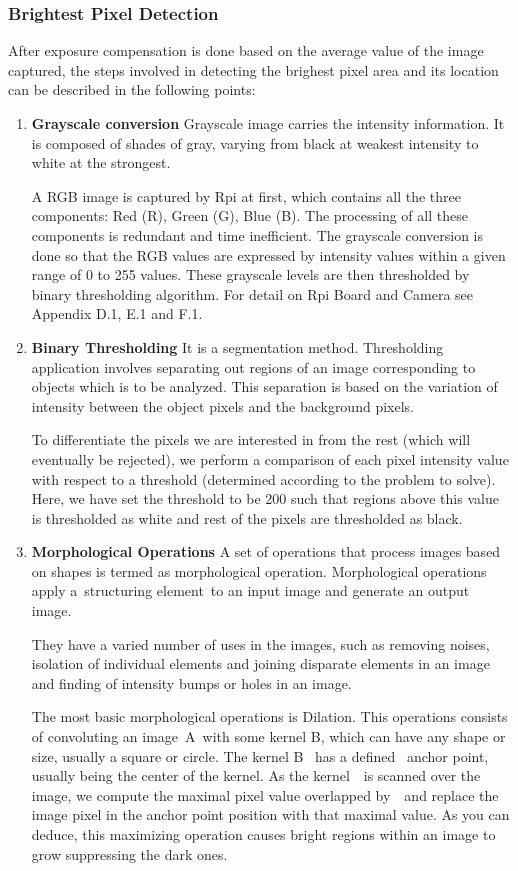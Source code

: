 \documentclass[12pt, a4paper]{article}
\begin{document}
\subsubsection{Brightest Pixel Detection}
After exposure compensation is done based on the average value of the image captured, the steps involved in detecting the brighest pixel area and its location can be described in the following points:
\begin{enumerate}
\item {\textbf{Grayscale conversion}} Grayscale image carries the intensity information. It is composed of shades of gray, varying from black at weakest intensity to white at the strongest. 

A RGB image is captured by Rpi at first, which contains all the three components: Red (R), Green (G), Blue (B). The processing of all these components is redundant and time inefficient. The grayscale conversion is done so that the RGB values are expressed by intensity values within a given range of 0 to 255 values. These grayscale levels are then thresholded by binary thresholding algorithm. For detail on Rpi Board and Camera see Appendix D.1, E.1 and F.1.
\newpage
\item {\textbf{Binary Thresholding}} It is a segmentation method. Thresholding application involves separating out regions of an image corresponding to objects which is to be analyzed. This separation is based on the variation of intensity between the object pixels and the background pixels.

To differentiate the pixels we are interested in from the rest (which will eventually be rejected), we perform a comparison of each pixel intensity value with respect to a threshold (determined according to the problem to solve). Here, we have set the threshold to be 200 such that regions above this value is thresholded as white and rest of the pixels are thresholded as black.

\item {\textbf{Morphological Operations}}
A set of operations that process images based on shapes is termed as morphological operation. Morphological operations apply a structuring element to an input image and generate an output image.

They have a varied number of uses in the images, such as removing noises, isolation of individual elements and joining disparate elements in an image and finding of intensity bumps or holes in an image. 

The most basic morphological operations is Dilation. This operations consists of convoluting an image A with some kernel B, which can have any shape or size, usually a square or circle. The kernel B  has a defined  anchor point, usually being the center of the kernel. As the kernel  is scanned over the image, we compute the maximal pixel value overlapped by  and replace the image pixel in the anchor point position with that maximal value. As you can deduce, this maximizing operation causes bright regions within an image to grow suppressing the dark ones.


\end{enumerate}
\end{document}
